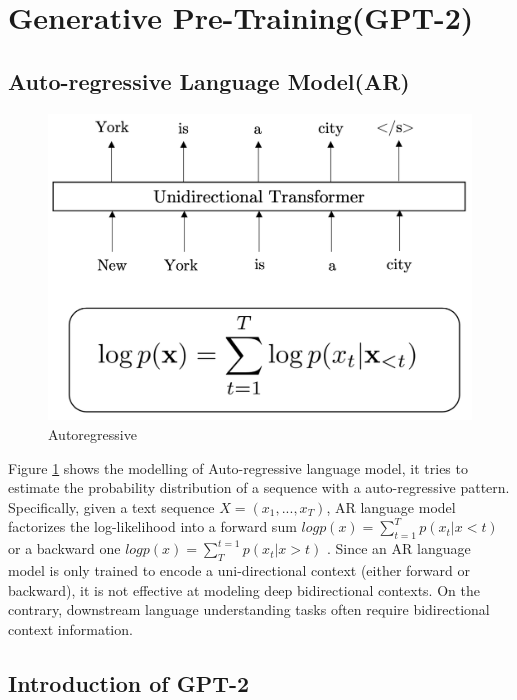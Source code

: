 \documentclass[]{krantz}
\begin{document}
\hypertarget{generative-pre-traininggpt-2}{%
\section{Generative Pre-Training(GPT-2)}\label{generative-pre-traininggpt-2}}

\hypertarget{auto-regressive-language-modelar}{%
\subsection{Auto-regressive Language Model(AR)}\label{auto-regressive-language-modelar}}

\begin{figure}

{\centering \includegraphics[width=0.5\linewidth]{figures/02-03-transfer-learning-for-nlp/autoregressive} 

}

\caption{Autoregressive}\label{fig:ch02-03-figure06}
\end{figure}

Figure \ref{fig:ch02-03-figure06} shows the modelling of Auto-regressive language model, it tries to estimate the probability distribution of a sequence with a auto-regressive pattern. Specifically, given a text sequence \(X = (x_1,...,x_T)\), AR language model factorizes the log-likelihood into a forward sum \(logp(x) = \sum^T_{t=1} p(x_t|x<t)\) or a backward one \(logp(x) = \sum^{t=1}_{T} p(x_t|x>t)\) \citet{yang2019xlnet}. Since an AR language model is only trained to encode a uni-directional context (either forward or backward), it is not effective at modeling deep bidirectional contexts. On the contrary, downstream language understanding tasks often require bidirectional context information.

\hypertarget{introduction-of-gpt-2}{%
\subsection{Introduction of GPT-2}\label{introduction-of-gpt-2}}
\end{document}
